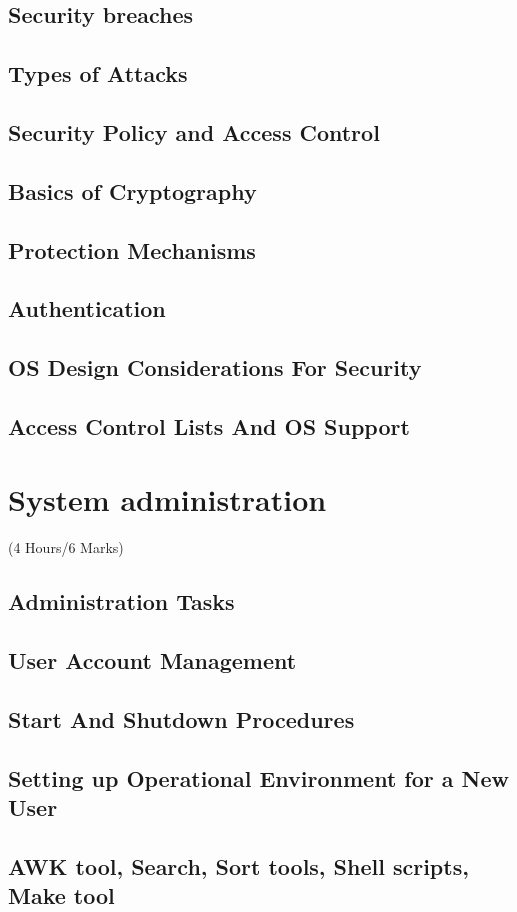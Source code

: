 \documentclass[12pt]{article}
\begin{document}
\subsection{Security breaches}
\subsection{Types of Attacks}
\subsection{Security Policy and Access Control}
\subsection{Basics of Cryptography}
\subsection{Protection Mechanisms}
\subsection{Authentication}
\subsection{OS Design Considerations For Security}
\subsection{Access Control Lists And OS Support}

\pagebreak
\section{System administration}
\begin{center}(4 Hours/6 Marks)\end{center}
\subsection{Administration Tasks}
\subsection{User Account Management}
\subsection{Start And Shutdown Procedures}
\subsection{Setting up Operational Environment for a New User}
\subsection{AWK tool, Search, Sort tools, Shell scripts, Make tool}
\end{document}
